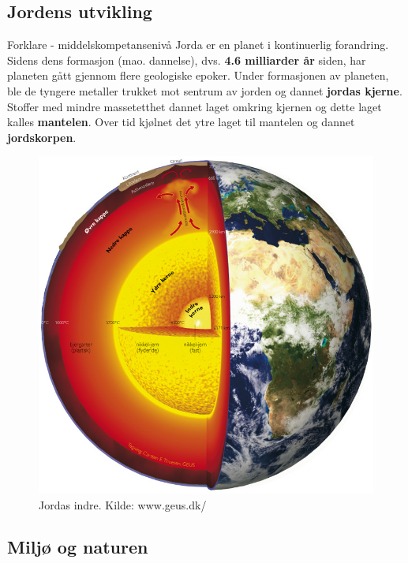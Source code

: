 \documentclass[main.tex]{subfiles}
\begin{document}
\subsection{Jordens utvikling}
{\color{Blue}Forklare - middelskompetansenivå}
\newline\newline
Jorda er en planet i kontinuerlig forandring. Sidens dens formasjon (mao. dannelse), dvs. \textbf{4.6 milliarder år} siden, har planeten gått gjennom flere geologiske epoker. Under formasjonen av planeten, ble de tyngere metaller trukket mot sentrum av jorden og dannet \textbf{jordas kjerne}. Stoffer med mindre massetetthet dannet laget omkring kjernen og dette laget kalles \textbf{mantelen}. Over tid kjølnet det ytre laget til mantelen og dannet \textbf{jordskorpen}.
\begin{figure}[h!]
    \label{fig:evolusjon}
    \centering
    \includegraphics[scale = 0.7]{../figures/jordas_indre.jpg}
    \caption{Jordas indre. Kilde: www.geus.dk/}
\end{figure}

\subsection{Miljø og naturen}
\end{document}
